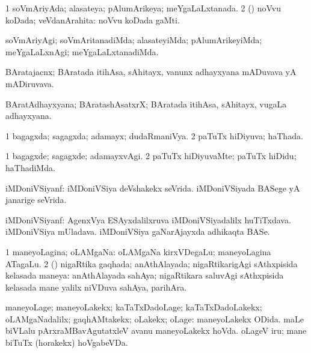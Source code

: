 \bentry
{}
\gl{\gu}
\bmng
\bnum
\num{1} soVmAriyAda; alasateya; pAlumArikeya; meYgaLaLxtanada. 
\num{2} (\veYshA) noVvu koDada; veVdanArahita:  noVvu koDada gaMti. 
\enum
\emng
\eentry

\bentry
{}
\gl{\kirxvi}
\bmng
soVmAriyAgi; soVmAritanadiMda; alasateyiMda; pAlumArikeyiMda; meYgaLaLxnAgi; meYgaLaLxtanadiMda. 
\emng
\eentry

\bentry
{}
\gl{\nA}
\bmng
BAratajacnx; BAratada itihAsa, sAhitayx, \mo vanunx adhayxyana mADuvava yA mADiruvava. 
\emng
\eentry

\bentry
{}
\gl{\nA}
\bmng
BAratAdhayxyana; BAratashAsatxrX; BAratada itihAsa, sAhitayx, \mo vugaLa adhayxyana. 
\emng
\eentry

\bentry
{}
\gl{\gu}
\bmng
\bnum
\num{1} bagagxda; sagagxda; adamayx; dudaRmaniVya. 
\num{2} paTuTx hiDiyuva; haThada. 
\enum
\emng
\eentry

\bentry
{}
\gl{\kirxvi}
\bmng
\bnum
\num{1} bagagxde; sagagxde; adamayxvAgi. 
\num{2} paTuTx hiDiyuvaMte; paTuTx hiDidu; haThadiMda. 
\enum
\emng
\eentry

\bentry
{}
\gl{\gu}
\bmng
iMDoniVSiyanf: 
\banum
{} iMDoniVSiya deVshakekx seVrida. 
 iMDoniVSiyada BASege yA janarige seVrida. 
\eanum
\emng
\eentry

\bentry
{}
\gl{\nA}
\bmng
iMDoniVSiyanf: 
\banum
{} AgenxVya ESAyxdalilxruva iMDoniVSiyadalilx huTiTxdava. 
 iMDoniVSiya mUladava. 
 iMDoniVSiya gaNarAjayxda adhikaqta BASe. 
\eanum
\emng
\eentry

\bentry
{}
\gl{\gu}
\bmng
\bnum
\num{1} maneyoLagina; oLAMgaNa:  oLAMgaNa kirxVDegaLu; maneyoLagina ATagaLu. 
\num{2} (\ca) nigaRtika gaqhada; anAthAlayada; nigaRtikarigAgi sAthxpisida kelasada maneya:  anAthAlayada sahAya; nigaRtikara saluvAgi sAthxpisida kelasada mane  yalilx niVDuva sahAya, parihAra. 
\enum
\emng
\eentry

\bentry
{}
\gl{\kirxvi}
\bmng
maneyoLage; maneyoLakekx; kaTaTxDadoLage; kaTaTxDadoLakekx; oLAMgaNadalilx; gaqhAMtakekx; oLakekx; oLage:  maneyoLakekx ODida.  maLe biVLalu pArxraMBavAgutatxleV avanu maneyoLakekx hoVda.  oLageV iru; mane biTuTx (horakekx) hoVgabeVDa. 
\emng
\eentry

